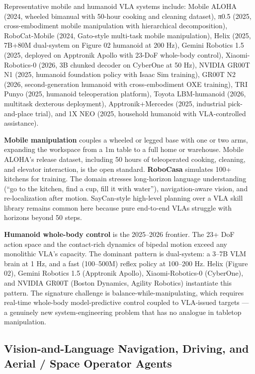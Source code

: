Representative mobile and humanoid VLA systems include: Mobile ALOHA (2024, wheeled bimanual with 50-hour cooking and cleaning dataset), π0.5 (2025, cross-embodiment mobile manipulation with hierarchical decomposition), RoboCat-Mobile (2024, Gato-style multi-task mobile manipulation), Helix (2025, 7B+80M dual-system on Figure 02 humanoid at 200 Hz), Gemini Robotics 1.5 (2025, deployed on Apptronik Apollo with 23-DoF whole-body control), Xiaomi-Robotics-0 (2026, 3B chunked decoder on CyberOne at 50 Hz), NVIDIA GR00T N1 (2025, humanoid foundation policy with Isaac Sim training), GR00T N2 (2026, second-generation humanoid with cross-embodiment OXE training), TRI Punyo (2025, humanoid teleoperation platform), Toyota LBM-humanoid (2026, multitask dexterous deployment), Apptronik+Mercedes (2025, industrial pick-and-place trial), and 1X NEO (2025, household humanoid with VLA-controlled assistance).

\textbf{Mobile manipulation} couples a wheeled or legged base with one or two arms, expanding the workspace from a 1m table to a full home or warehouse. Mobile ALOHA's release dataset, including 50 hours of teleoperated cooking, cleaning, and elevator interaction, is the open standard. \textbf{RoboCasa} simulates 100+ kitchens for training. The domain stresses long-horizon language understanding (``go to the kitchen, find a cup, fill it with water''), navigation-aware vision, and re-localization after motion. SayCan-style high-level planning over a VLA skill library remains common here because pure end-to-end VLAs struggle with horizons beyond 50 steps.

\textbf{Humanoid whole-body control} is the 2025--2026 frontier. The 23+ DoF action space and the contact-rich dynamics of bipedal motion exceed any monolithic VLA's capacity. The dominant pattern is dual-system: a 3--7B VLM brain at 1 Hz, and a fast (100--500M) reflex policy at 100--200 Hz. Helix (Figure 02), Gemini Robotics 1.5 (Apptronik Apollo), Xiaomi-Robotics-0 (CyberOne), and NVIDIA GR00T (Boston Dynamics, Agility Robotics) instantiate this pattern. The signature challenge is balance-while-manipulating, which requires real-time whole-body model-predictive control coupled to VLA-issued targets --- a genuinely new system-engineering problem that has no analogue in tabletop manipulation.

\subsection{Vision-and-Language Navigation, Driving, and Aerial / Space Operator Agents}\label{vision-and-language-navigation-driving-and-aerial-space-operator-agents}

